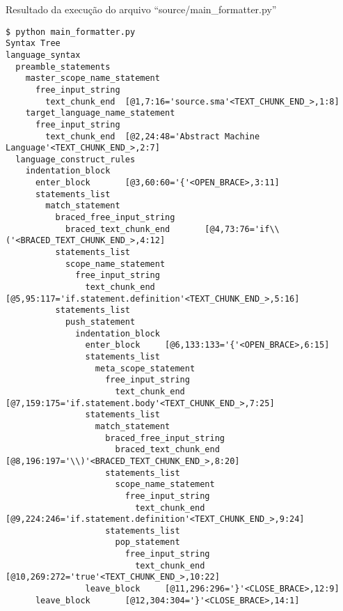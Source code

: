 \begin{code}
\caption{Resultado da execução do arquivo ``source/main\_formatter.py''}
\label{MainFormatterPyResult}
\begin{verbatim}
$ python main_formatter.py
Syntax Tree
language_syntax
  preamble_statements
    master_scope_name_statement
      free_input_string
        text_chunk_end  [@1,7:16='source.sma'<TEXT_CHUNK_END_>,1:8]
    target_language_name_statement
      free_input_string
        text_chunk_end  [@2,24:48='Abstract Machine Language'<TEXT_CHUNK_END_>,2:7]
  language_construct_rules
    indentation_block
      enter_block       [@3,60:60='{'<OPEN_BRACE>,3:11]
      statements_list
        match_statement
          braced_free_input_string
            braced_text_chunk_end       [@4,73:76='if\\('<BRACED_TEXT_CHUNK_END_>,4:12]
          statements_list
            scope_name_statement
              free_input_string
                text_chunk_end  [@5,95:117='if.statement.definition'<TEXT_CHUNK_END_>,5:16]
          statements_list
            push_statement
              indentation_block
                enter_block     [@6,133:133='{'<OPEN_BRACE>,6:15]
                statements_list
                  meta_scope_statement
                    free_input_string
                      text_chunk_end    [@7,159:175='if.statement.body'<TEXT_CHUNK_END_>,7:25]
                statements_list
                  match_statement
                    braced_free_input_string
                      braced_text_chunk_end     [@8,196:197='\\)'<BRACED_TEXT_CHUNK_END_>,8:20]
                    statements_list
                      scope_name_statement
                        free_input_string
                          text_chunk_end        [@9,224:246='if.statement.definition'<TEXT_CHUNK_END_>,9:24]
                    statements_list
                      pop_statement
                        free_input_string
                          text_chunk_end        [@10,269:272='true'<TEXT_CHUNK_END_>,10:22]
                leave_block     [@11,296:296='}'<CLOSE_BRACE>,12:9]
      leave_block       [@12,304:304='}'<CLOSE_BRACE>,14:1]


\end{verbatim}
\end{code}
